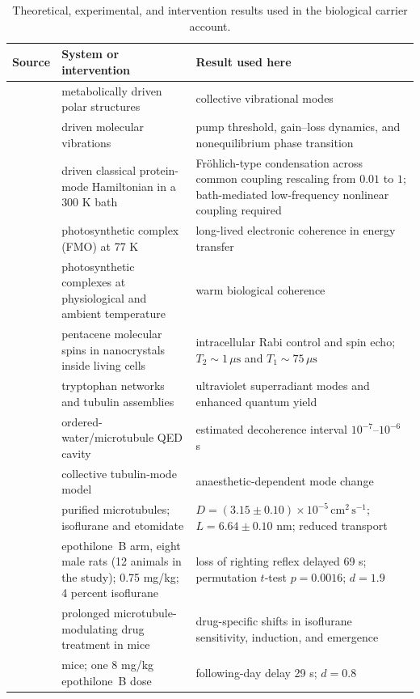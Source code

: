 \begin{table}[H]
\centering
\footnotesize
\begin{tabular}{@{}
  >{\raggedright\arraybackslash}p{3.0cm}
  >{\raggedright\arraybackslash}p{5.2cm}
  >{\raggedright\arraybackslash}p{5.0cm}@{}}
\toprule
Source & System or intervention & Result used here \\
\midrule
\citet{frohlich1968} & metabolically driven polar structures & collective vibrational modes \\
\citet{zhang2019frohlich,wang2022frohlich} & driven molecular vibrations & pump threshold, gain--loss dynamics, and nonequilibrium phase transition \\
\citet{preto2026} & driven classical protein-mode Hamiltonian in a 300 K bath & Fr\"ohlich-type condensation across common coupling rescaling from $0.01$ to $1$; bath-mediated low-frequency nonlinear coupling required \\
\citet{engel2007} & photosynthetic complex (FMO) at 77 K & long-lived electronic coherence in energy transfer \\
\citet{panitchayangkoon2010,collini2010} & photosynthetic complexes at physiological and ambient temperature & warm biological coherence \\
\citet{ishiwata2026} & pentacene molecular spins in nanocrystals inside living cells & intracellular Rabi control and spin echo; $T_2\sim1\,\mu\mathrm{s}$ and $T_1\sim75\,\mu\mathrm{s}$ \\
\citet{babcock2024} & tryptophan networks and tubulin assemblies & ultraviolet superradiant modes and enhanced quantum yield \\
\citet{mavromatos2025} & ordered-water/microtubule QED cavity & estimated decoherence interval $10^{-7}$--$10^{-6}$ s \\
\citet{craddock2017} & collective tubulin-mode model & anaesthetic-dependent mode change \\
\citet{kalra2023} & purified microtubules; isoflurane and etomidate & $D=(3.15\pm0.10)\times10^{-5}\,\mathrm{cm^2\,s^{-1}}$; $L=6.64\pm0.10$ nm; reduced transport \\
\citet{khan2024} & epothilone~B arm, eight male rats (12 animals in the study); 0.75 mg/kg; 4 percent isoflurane & loss of righting reflex delayed 69 s; permutation $t$-test $p=0.0016$; $d=1.9$ \\
\citet{li2025} & prolonged microtubule-modulating drug treatment in mice & drug-specific shifts in isoflurane sensitivity, induction, and emergence \\
\citet{huang2026} & mice; one 8 mg/kg epothilone~B dose & following-day delay 29 s; $d=0.8$ \\
\bottomrule
\end{tabular}
\caption{Theoretical, experimental, and intervention results used in the biological
carrier account.}
\label{tab:biological_carrier_constraints}
\end{table}

